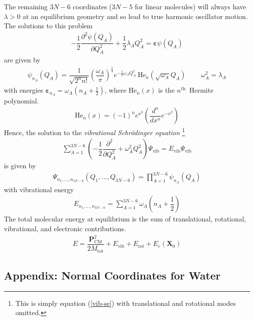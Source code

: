 \documentclass[11pt]{article}
\newcommand{\bo}[1]{\ensuremath{\mathbf{#1}}}
\renewcommand{\sp}{\ \ \ \ \ \ \ \ \ \ }
\newcommand{\fr}[2]{\dfrac{#1}{#2}}
\newcommand{\pr}[1]{\left(#1\right)}
\newcommand{\pd}[3]{\ensuremath{ \dfrac{ \partial^{#1} #2 }{\partial #3 ^{#1}}}}
\newcommand{\eth}{\ensuremath{^\text{th}}}
\newcommand{\ld}{\ensuremath{\ldots}}
\newcommand{\Y}{\ensuremath{\Psi}}
\newcommand{\y}{\ensuremath{\psi}}
\newcommand{\w}{\ensuremath{\omega}}
\newcommand{\la}{\ensuremath{\lambda}}
\newcommand{\e}{\ensuremath{\bm\varepsilon}}
\begin{document}
The remaining $3N-6$ coordinates ($3N-5$ for linear molecules) will always have $\la>0$ at an equilibrium geometry and so lead to true harmonic oscillator motion.
The solutions to this problem
\begin{align}
-\fr{1}{2}
	\pd{2}{\y(Q_A)}{Q_A}
+\fr{1}{2}
	\la_A
	Q_A^2
=
	\e
	\y(Q_A)
\end{align}
are given by
\begin{align}
%
	\y_{n_A}(Q_A)
=
\fr{1}{\sqrt{2^n n!}}\pr{\fr{\w_A}{\pi}}^{\frac{1}{4}}
	e^{-\frac{1}{2}\w_AQ_A^2}
	\ \text{He}_n(\sqrt{\w_A}Q_A)
\sp
	\w_A^2=\la_A
\end{align}
with energies $\e_{n_A}=\w_A(n_A+\frac{1}{2})$, where $\text{He}_n(x)$ is the $n$\eth\ Hermite polynomial.
\begin{align}
%
	\text{He}_n(x)
=
	(-1)^n
	e^{x^2}
	\pr{\fr{d^n}{dx^n}e^{-x^2}}
\end{align}
Hence, the solution to the {\it vibrational Schr\"odinger equation} \footnote{This is simply equation (\ref{vib-se}) with translational and rotational modes omitted.}
\begin{align}
\sum_{A=1}^{3N-6}
	\pr{-\fr{1}{2}\pd{2}{}{Q_A}+\w_A^2Q_A^2}
	\Y_\text{vib}
=
	E_\text{vib}
	\Y_\text{vib}
\end{align}
is given by
\begin{align}
%
	\Y_{n_1,\ld,n_{3N-6}}(Q_1,\ld,Q_{3N-6})
=
\prod_{A=1}^{3N-6}
	\y_{n_A}(Q_A)
\end{align}
with vibrational energy
\begin{align}
%
	E_{n_1,\ld,n_{3N-6}}
=
\sum_{A=1}^{3N-6}
	\w_A
	\pr{n_A+\fr{1}{2}}
\end{align}
The total molecular energy at equilibrium is the sum of translational, rotational, vibrational, and electronic contributions.
\begin{align}
	E
=
	\fr{\bo{P}_\text{CM}^2}{2M_\text{tot}}
+
	E_\text{vib}
+
	E_\text{rot}
+
	E_e(\bo{X}_0)
\end{align}



\newpage
\subsection{Appendix: Normal Coordinates for Water}
\end{document}
